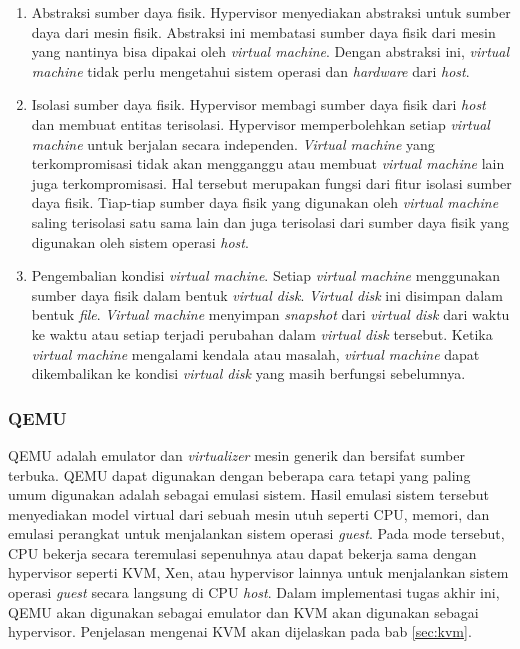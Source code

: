 \begin{enumerate}
  
  \item Abstraksi sumber daya fisik. Hypervisor menyediakan abstraksi untuk sumber
    daya dari mesin fisik. Abstraksi ini membatasi sumber daya fisik dari mesin yang
    nantinya bisa dipakai oleh \emph{virtual machine}. Dengan abstraksi ini,
    \emph{virtual machine} tidak perlu mengetahui sistem operasi dan \emph{hardware}
    dari \emph{host}.

  \item Isolasi sumber daya fisik. Hypervisor membagi sumber daya fisik dari \emph{host}
    dan membuat entitas terisolasi. Hypervisor memperbolehkan setiap \emph{virtual machine} 
    untuk berjalan secara independen. \emph{Virtual machine} yang terkompromisasi tidak
    akan mengganggu atau membuat \emph{virtual machine} lain juga terkompromisasi. Hal
    tersebut merupakan fungsi dari fitur isolasi sumber daya fisik. Tiap-tiap sumber daya fisik
    yang digunakan oleh \emph{virtual machine} saling terisolasi satu sama lain dan juga
    terisolasi dari sumber daya fisik yang digunakan oleh sistem operasi \emph{host}.

  \item Pengembalian kondisi \emph{virtual machine}. Setiap \emph{virtual machine} menggunakan
    sumber daya fisik dalam bentuk \emph{virtual disk}. \emph{Virtual disk} ini disimpan
    dalam bentuk \emph{file}. \emph{Virtual machine} menyimpan \emph{snapshot} dari \emph{virtual disk}
    dari waktu ke waktu atau setiap terjadi perubahan dalam \emph{virtual disk} tersebut. Ketika \emph{virtual machine}
    mengalami kendala atau masalah, \emph{virtual machine} dapat dikembalikan ke kondisi \emph{virtual disk}
    yang masih berfungsi sebelumnya.

\end{enumerate}

\subsubsection{QEMU}

QEMU \parencite{qemu-website} adalah emulator dan \emph{virtualizer} mesin generik dan bersifat sumber terbuka.
QEMU dapat digunakan dengan beberapa cara tetapi yang paling umum digunakan adalah sebagai
emulasi sistem. Hasil emulasi sistem tersebut menyediakan model virtual dari sebuah mesin
utuh seperti CPU, memori, dan emulasi perangkat untuk menjalankan sistem operasi \emph{guest}.
Pada mode tersebut, CPU bekerja secara teremulasi sepenuhnya atau dapat bekerja sama
dengan hypervisor seperti KVM, Xen, atau hypervisor lainnya untuk menjalankan sistem
operasi \emph{guest} secara langsung di CPU \emph{host}.
Dalam implementasi tugas akhir ini, QEMU akan digunakan sebagai emulator dan KVM
akan digunakan sebagai hypervisor. Penjelasan mengenai KVM akan dijelaskan pada bab \ref{sec:kvm}.

